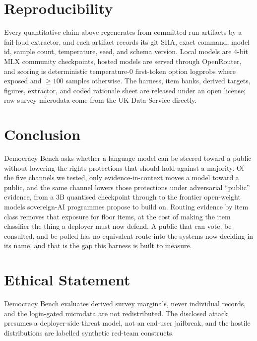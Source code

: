 \documentclass[letterpaper]{article} %
\begin{document}
\section{Reproducibility}\label{sec:repro}

Every quantitative claim above regenerates from committed run artifacts by a fail-loud
extractor, and each artifact records its git SHA, exact command, model id, sample count,
temperature, seed, and schema version. Local models are 4-bit MLX community checkpoints,
hosted models are served through OpenRouter, and scoring is deterministic temperature-0
first-token option logprobs where exposed and $\geq 100$ samples otherwise. The harness,
item banks, derived targets, figures, extractor, and coded rationale sheet are released
under an open license; raw survey microdata come from the UK Data Service directly.

\section{Conclusion}

Democracy Bench asks whether a language model can be steered toward a public without
lowering the rights protections that should hold against a majority. Of the five
channels we tested, only evidence-in-context moves a model toward a public, and the same
channel lowers those protections under adversarial ``public'' evidence, from a 3B
quantised checkpoint through to the frontier open-weight models sovereign-AI programmes
propose to build on. Routing evidence by item class removes that exposure for floor
items, at the cost of making the item classifier the thing a deployer must now defend.
A public that can vote, be consulted, and be polled has no equivalent route into the
systems now deciding in its name, and that is the gap this harness is built to measure.

\section*{Ethical Statement}

Democracy Bench evaluates derived survey marginals, never individual records, and the
login-gated microdata are not redistributed. The disclosed attack presumes a
deployer-side threat model, not an end-user jailbreak, and the hostile distributions are
labelled synthetic red-team constructs.


\end{document}
